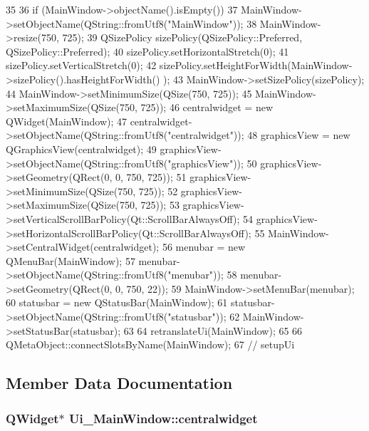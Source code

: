 \begin{DoxyCode}
35     {
36         if (MainWindow->objectName().isEmpty())
37             MainWindow->setObjectName(QString::fromUtf8("MainWindow"));
38         MainWindow->resize(750, 725);
39         QSizePolicy sizePolicy(QSizePolicy::Preferred, QSizePolicy::Preferred);
40         sizePolicy.setHorizontalStretch(0);
41         sizePolicy.setVerticalStretch(0);
42         sizePolicy.setHeightForWidth(MainWindow->sizePolicy().hasHeightForWidth()
      );
43         MainWindow->setSizePolicy(sizePolicy);
44         MainWindow->setMinimumSize(QSize(750, 725));
45         MainWindow->setMaximumSize(QSize(750, 725));
46         centralwidget = new QWidget(MainWindow);
47         centralwidget->setObjectName(QString::fromUtf8("centralwidget"));
48         graphicsView = new QGraphicsView(centralwidget);
49         graphicsView->setObjectName(QString::fromUtf8("graphicsView"));
50         graphicsView->setGeometry(QRect(0, 0, 750, 725));
51         graphicsView->setMinimumSize(QSize(750, 725));
52         graphicsView->setMaximumSize(QSize(750, 725));
53         graphicsView->setVerticalScrollBarPolicy(Qt::ScrollBarAlwaysOff);
54         graphicsView->setHorizontalScrollBarPolicy(Qt::ScrollBarAlwaysOff);
55         MainWindow->setCentralWidget(centralwidget);
56         menubar = new QMenuBar(MainWindow);
57         menubar->setObjectName(QString::fromUtf8("menubar"));
58         menubar->setGeometry(QRect(0, 0, 750, 22));
59         MainWindow->setMenuBar(menubar);
60         statusbar = new QStatusBar(MainWindow);
61         statusbar->setObjectName(QString::fromUtf8("statusbar"));
62         MainWindow->setStatusBar(statusbar);
63 
64         retranslateUi(MainWindow);
65 
66         QMetaObject::connectSlotsByName(MainWindow);
67     } // setupUi
\end{DoxyCode}


\subsection{Member Data Documentation}
\hypertarget{class_ui___main_window_a356f1cf3ebda15f1fac59467ee081b74}{
\subsubsection[{centralwidget}]{\setlength{\rightskip}{0pt plus 5cm}QWidget$\ast$ {\bf Ui\_\-MainWindow::centralwidget}}}
\label{class_ui___main_window_a356f1cf3ebda15f1fac59467ee081b74}


